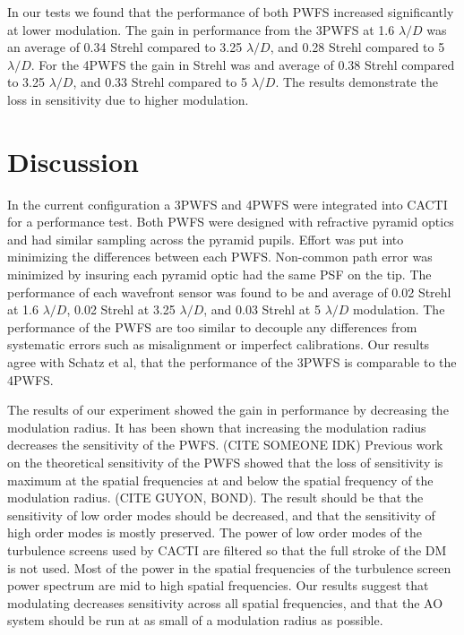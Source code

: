 \documentclass[12pt]{spieman}  %
\begin{document}
\begin{spacing}{2}
In our tests we found that the performance of both PWFS increased significantly at lower modulation. The gain in performance from the 3PWFS at 1.6 $\lambda/D$ was an average of 0.34 Strehl compared to 3.25 $\lambda/D$, and 0.28 Strehl compared to 5 $\lambda/D$. For the 4PWFS the gain in Strehl was and average of  0.38 Strehl compared to 3.25 $\lambda/D$, and 0.33 Strehl compared to 5 $\lambda/D$. The results demonstrate the loss in sensitivity due to higher modulation. 


\section{Discussion}

In the current configuration a 3PWFS and 4PWFS were integrated into CACTI for a performance test. Both PWFS were designed with refractive pyramid optics and had similar sampling across the pyramid pupils. Effort was put into minimizing the differences between each PWFS. Non-common path error was minimized by insuring each pyramid optic had the same PSF on the tip. The performance of each wavefront sensor was found to be and average of 0.02 Strehl at 1.6 $\lambda/D$, 0.02 Strehl at 3.25 $\lambda/D$, and 0.03 Strehl at 5 $\lambda/D$ modulation. The performance of the PWFS are too similar to decouple any differences from systematic errors such as misalignment or imperfect calibrations. Our results agree with Schatz et al, that the performance of the 3PWFS is comparable to the 4PWFS. 

The results of our experiment showed the gain in performance by decreasing the modulation radius. It has been shown that increasing the modulation radius decreases the sensitivity of the PWFS. (CITE SOMEONE IDK) Previous work on the theoretical sensitivity of the PWFS showed that the loss of sensitivity is maximum at the spatial frequencies at and below the spatial frequency of the modulation radius. (CITE GUYON, BOND). The result should be that the sensitivity of low order modes should be decreased, and that the sensitivity of high order modes is mostly preserved. The power of low order modes of the turbulence screens used by CACTI are filtered so that the full stroke of the DM is not used. Most of the power in the spatial frequencies of the turbulence screen power spectrum are mid to high spatial frequencies. Our results suggest that modulating decreases sensitivity across all spatial frequencies, and that the AO system should be run at as small of a modulation radius as possible. 




\end{spacing}
\end{document}
